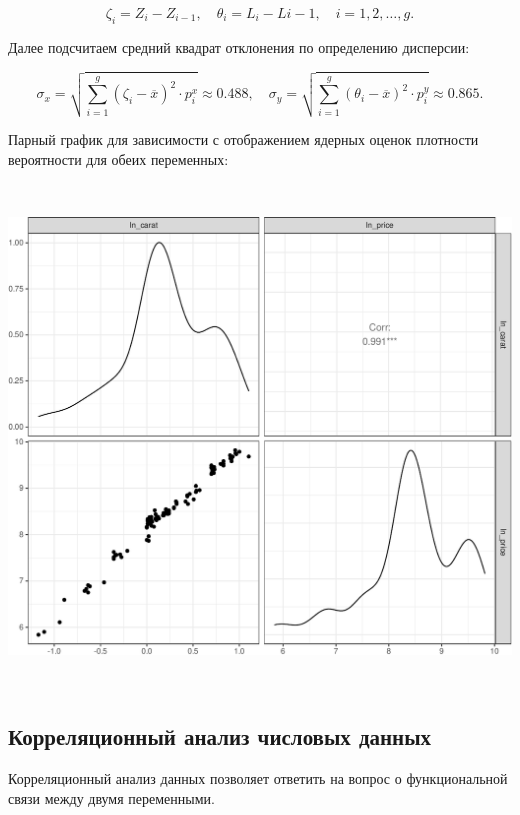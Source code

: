 \documentclass[
]{article}
\begin{document}
\[
\zeta_i = Z_{i} - Z_{i-1},\quad \theta_i = L_i - L{i-1}, \quad i=1,2,\dots, g.
\]

Далее подсчитаем средний квадрат отклонения по определению дисперсии:

\[
\sigma_x = \sqrt{\sum\limits_{i = 1}^{g} (\zeta_i - \overline{x})^2 \cdot p^x_i} \approx 0.488, \quad 
\sigma_y = \sqrt{\sum\limits_{i = 1}^{g} (\theta_i - \overline{x})^2 \cdot p^y_i} \approx 0.865.
\]

Парный график для зависимости с отображением ядерных оценок плотности
вероятности для обеих переменных:

\(\ \)

\begin{center}\includegraphics[width=0.85\linewidth]{Prac5_files/figure-latex/unnamed-chunk-10-1} \end{center}

\(\ \)

\hypertarget{ux43aux43eux440ux440ux435ux43bux44fux446ux438ux43eux43dux43dux44bux439-ux430ux43dux430ux43bux438ux437-ux447ux438ux441ux43bux43eux432ux44bux445-ux434ux430ux43dux43dux44bux445}{%
\subsection{\texorpdfstring{\textbf{Корреляционный анализ числовых
данных}}{Корреляционный анализ числовых данных}}\label{ux43aux43eux440ux440ux435ux43bux44fux446ux438ux43eux43dux43dux44bux439-ux430ux43dux430ux43bux438ux437-ux447ux438ux441ux43bux43eux432ux44bux445-ux434ux430ux43dux43dux44bux445}}

Корреляционный анализ данных позволяет ответить на вопрос о
функциональной связи между двумя переменными.
\end{document}
